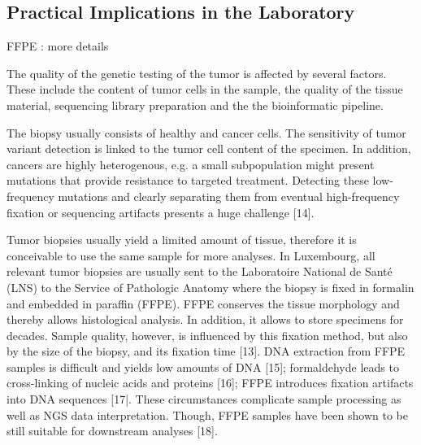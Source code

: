 \subsection{Practical Implications in the Laboratory}

FFPE : more details

The quality of the genetic testing of the tumor is affected by several factors. These include the content of tumor cells in the sample, the quality of the tissue material, sequencing library preparation and the the bioinformatic pipeline.

The biopsy usually consists of healthy and cancer cells. The sensitivity of tumor variant detection is linked to the tumor cell content of the specimen. In addition, cancers are highly heterogenous, e.g. a small subpopulation might present mutations that provide resistance to targeted treatment. Detecting these low-frequency mutations and clearly separating them from eventual high-frequency fixation or sequencing artifacts presents a huge challenge [14].

Tumor biopsies usually yield a limited amount of tissue, therefore it is conceivable to use the same sample for more analyses. In Luxembourg, all relevant tumor biopsies are usually sent to the Laboratoire National de Santé (LNS) to the Service of Pathologic Anatomy where the biopsy is fixed in formalin and embedded in paraffin (FFPE). FFPE conserves the tissue morphology and thereby allows histological analysis. In addition, it allows to store specimens for decades. Sample quality, however, is influenced by this fixation method, but also by the size of the biopsy, and its fixation time [13]. DNA extraction from FFPE samples is difficult and yields low amounts of DNA [15]; formaldehyde leads to cross-linking of nucleic acids and proteins [16]; FFPE introduces fixation artifacts into DNA sequences [17|. These circumstances complicate sample processing as well as NGS data interpretation. Though, FFPE samples have been shown to be still suitable for downstream analyses [18].

